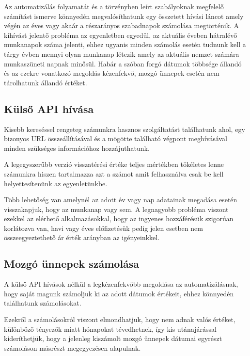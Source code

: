 
Az automatizálás folyamatát és a törvényben leírt szabályoknak megfelelő számítást ismerve könnyedén megvalósíthatunk egy összetett hívási láncot amely végén az éves vagy akaár a részarányos szabadnapok számolása megtörténik.
A kihívást jelentő probléma az egyenletben egyedül, az aktuális éveben hátralévő munkanapok száma jelenti, ehhez ugyanis minden számolás esetén tudnunk kell a tárgy évben mennyi olyan munkanap létezik amely az aktuális nemzet számára munkaszüneti napnak minősül.
\vskip 0.2in
Habár a szóban forgó dátumok többsége állandó és az ezekre vonatkozó megoldás kézenfekvő, mozgó ünnepek esetén nem tárolhatunk állandó értéket. 

\subsection{Külső API hívása}
Kisebb kereséssel rengeteg számunkra hasznos szolgáltatást találhatunk ahol, egy bizonyos URL összeállításával és a mögötte található végpont meghívásával minden szükséges információhoz hozzájuthatunk.

A legegyszerűbb verzió visszatérési értéke teljes mértékben tökéletes lenne számunkra hiszen tartalmazza azt a számot amit felhasználva csak be kell helyettesítenünk az egyenletünkbe.

Több lehetőség van amelynél az adott év vagy nap adatainak megadása esetén visszakapjuk, hogy az munkanap vagy sem.
\vskip0.2in
A legnagyobb probléma viszont ezekkel az elérhető alkalmazásokkal, hogy az ingyenes hozzáférésük szigorúan korlátozva van, havi vagy éves előfizetésük pedig jelen esetben nem összeegyeztethető ár érték arányban az igényeinkkel.

\subsection{Mozgó ünnepek számolása}

A külső API hívások nélkül a legkézenfekvőbb megoldása az automatizálásnak, hogy saját magunk számoljuk ki az adott dátumok értékeit, ehhez könnyedén találhatunk számolásokat. 

Ezekről a számolásokról viszont elmondhatjuk, hogy nem adnak valós értéket, különböző tényezők miatt hónapokat tévedhetnek, így kis utánajárással kideríthetjük, hogy a jelenleg kiszámolt mozgó ünnepek dátumai egyrészt számoláson másrészt megegyezésen alapulnak.

